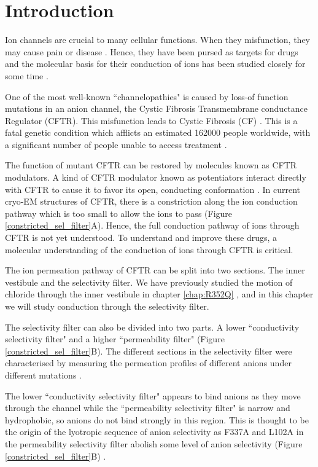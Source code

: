 \section{Introduction}

Ion channels are crucial to many cellular functions. When they misfunction, they may cause pain or disease \cite{kingwell2019, kim2014}. Hence, they have been pursed as targets for drugs and the molecular basis for their conduction of ions has been studied closely for some time \cite{santos2017, doyle1998, roux1993}.

One of the most well-known ``channelopathies" is caused by loss-of function mutations in an anion channel, the Cystic Fibrosis Transmembrane conductance Regulator (CFTR). This misfunction leads to Cystic Fibrosis (CF) \cite{riordan1989,gadsby2006}. This is a fatal genetic condition which afflicts an estimated 162000 people worldwide, with a significant number of people unable to access treatment \cite{guo2022}.

The function of mutant CFTR can be restored by molecules known as CFTR modulators. A kind of CFTR modulator known as potentiators interact directly with CFTR to cause it to favor its open, conducting conformation \cite{liu2019}. In current cryo-EM structures of CFTR, there is a constriction along the ion conduction pathway which is too small to allow the ions to pass \cite{zhang2018} (Figure \ref{constricted_sel_filter}A). Hence, the full conduction pathway of ions through CFTR is not yet understood. To understand and improve these drugs, a molecular understanding of the conduction of ions through CFTR is critical. 

The ion permeation pathway of CFTR can be split into two sections. The inner vestibule and the selectivity filter. We have previously studied the motion of chloride through the inner vestibule in chapter \ref{chap:R352Q} \cite{wong2022a}, and in this chapter we will study conduction through the selectivity filter.

The selectivity filter can also be divided into two parts. A lower ``conductivity selectivity filter" and a higher ``permeability filter" (Figure \ref{constricted_sel_filter}B). The different sections in the selectivity filter were characterised by measuring the permeation profiles of different anions under different mutations \cite{linsdell2016}. 

The lower ``conductivity selectivity filter" appears to bind anions as they move through the channel while the ``permeability selectivity filter" is narrow and hydrophobic, so anions do not bind strongly in this region. This is thought to be the origin of the lyotropic sequence of anion selectivity as F337A and L102A in the permeability selectivity filter abolish some level of anion selectivity (Figure \ref{constricted_sel_filter}B) \cite{linsdell2021}. 

